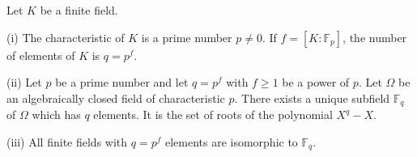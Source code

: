 Let $K$ be a finite field.

(i) The characteristic of $K$ is a prime number $p \neq 0$. If $f = [K : \mathbb{F}_p]$, the number of elements of $K$ is $q = p^f$.

(ii) Let $p$ be a prime number and let $q = p^f$ with $f \geq 1$ be a power of $p$. Let $\Omega$ be an algebraically closed field of characteristic $p$. There exists a unique subfield $\mathbb{F}_q$ of $\Omega$ which has $q$ elements. It is the set of roots of the polynomial $X^q - X$.

(iii) All finite fields with $q = p^f$ elements are isomorphic to $\mathbb{F}_q$.
